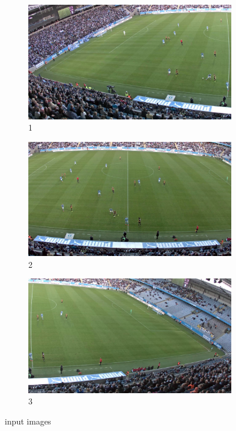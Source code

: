 \begin{figure}
	\centering
	\begin{subfigure}[t]{0.3\textwidth}
		\centering
		\includegraphics[width=\textwidth]{../data/20150521_194353_C1D8.jpg}
		\caption{1}
	\end{subfigure}
	\begin{subfigure}[t]{0.3\textwidth}
		\centering
		\includegraphics[width=\textwidth]{../data/20150521_194353_FD1E.jpg}
		\caption{2}
	\end{subfigure}
		\begin{subfigure}[t]{0.3\textwidth}
		\centering
		\includegraphics[width=\textwidth]{../data/20150521_194353_49E3.jpg}
		\caption{3}
	\end{subfigure}
	\caption{input images}
	\label{fig:input}
\end{figure}




